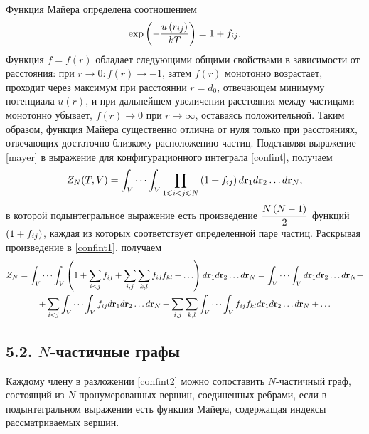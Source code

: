Функция Майера определена соотношением
\vverh
\begin{gather}
	\exp \left( - \frac{u \left( r_{ij} \right)}{kT} \right) = 1 + f_{ij} . \label{mayer}
\end{gather}
Функция $f = f(r)$ обладает следующими общими свойствами в зависимости от расстояния: при $r \longrightarrow 0: f(r) \longrightarrow -1$, затем $f(r)$ монотонно возрастает, проходит через максимум при расстоянии $r = d_0$, отвечающем минимуму потенциала $u(r)$, и при дальнейшем увеличении расстояния между частицами монотонно убывает, $f(r) \longrightarrow 0$ при $r \longrightarrow \infty$, оставаясь положительной. Таким образом, функция Майера существенно отлична от нуля только при расстояниях, отвечающих достаточно близкому расположению частиц. Подставляя выражение \eqref{mayer} в выражение для конфигурационного интеграла \eqref{confint}, получаем
\vverh
\begin{gather}
	Z_N (T, V) = \int_V \cdots \int_V \prod_{1 \leqslant i < j \leqslant N} \left( 1 + f_{ij} \right) d \mathbf{r}_1 d \mathbf{r}_2 \dots d \mathbf{r}_N , \label{confint1}
\end{gather}
в которой подынтегральное выражение есть произведение $\displaystyle\frac{N \left( N - 1 \right)}{2}$ функций $\left( 1 + f_{ij} \right)$, каждая из которых соответствует определенной паре частиц. Раскрывая произведение в \eqref{confint1}, получаем
\vverh
\begin{gather}
	Z_N = \int_V \cdots \int_V \lb 1 + \sum_{i < j} f_{ij} + \sum_{i, j} \sum_{k,l} f_{ij} f_{kl} + \dots \rb d \mathbf{r}_1 d \mathbf{r}_2 \dots d \mathbf{r}_N = \int_V \cdots \int_V d \mathbf{r}_1 d \mathbf{r}_2 \dots d \mathbf{r}_N + \notag \\ 
	+ \sum_{i < j} \int_V \cdots \int_V f_{ij} d \mathbf{r}_1 d \mathbf{r}_2 \dots d \mathbf{r}_N + \sum_{i, j} \sum_{k, l} \int_V \cdots \int_V f_{ij} f_{kl} d \mathbf{r}_1 d \mathbf{r}_2 \dots d \mathbf{r}_N + \dots \label{confint2}  
\end{gather}

\subsection*{\textbf{5.2.} $N$-частичные графы \cite{mayer}}

Каждому члену в разложении \eqref{confint2} можно сопоставить $N$-частичный граф, состоящий из $N$ пронумерованных вершин, соединенных ребрами, если в подынтегральном выражении есть функция Майера, содержащая индексы рассматриваемых вершин.

